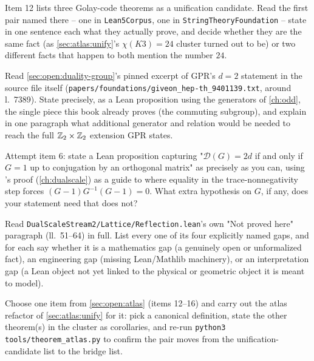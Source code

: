 \begin{exercise}[$\star$]
Item 12 lists three Golay-code theorems as a unification candidate. Read the first pair
named there -- one in \texttt{Lean5Corpus}, one in \texttt{StringTheoryFoundation} -- state
in one sentence each what they actually prove, and decide whether they are the same fact
(as \cref{sec:atlas:unify}'s $\chi(K3)=24$ cluster turned out to be) or two different facts
that happen to both mention the number $24$.
\end{exercise}

\begin{exercise}[$\star\star$]
Read \cref{sec:open:duality-group}'s pinned excerpt of GPR's $d=2$ statement in the source
file itself (\texttt{papers/foundations/giveon\_hep-th\_9401139.txt}, around l.~7389).
State precisely, as a Lean proposition using the generators of \cref{ch:odd}, the single
piece this book already proves (the commuting subgroup), and explain in one paragraph what
additional generator and relation would be needed to reach the full $\mathbb{Z}_2\times\mathbb{Z}_2$
extension GPR states.
\end{exercise}

\begin{exercise}[$\star\star$]
Attempt item 6: state a Lean proposition capturing "$\mathcal D(G)=2d$ if and only if $G=1$
up to conjugation by an orthogonal matrix" as precisely as you can, using
's proof (\cref{ch:dualscale}) as a guide to where equality in the
trace-nonnegativity step forces $(G-1)G^{-1}(G-1)=0$. What extra hypothesis on $G$, if any,
does your statement need that  does not?
\end{exercise}

\begin{exercise}[$\star\star$]
Read \texttt{DualScaleStream2/Lattice/Reflection.lean}'s own "Not proved here" paragraph
(ll.~51--64) in full. List every one of its four explicitly named gaps, and for each say
whether it is a mathematics gap (a genuinely open or unformalized fact), an engineering
gap (missing Lean/Mathlib machinery), or an interpretation gap (a Lean object not yet
linked to the physical or geometric object it is meant to model).
\end{exercise}

\begin{exercise}[$\star\star$]
Choose one item from \cref{sec:open:atlas} (items 12--16) and carry out the atlas
refactor of \cref{sec:atlas:unify} for it: pick a canonical definition, state the other
theorem(s) in the cluster as corollaries, and re-run
\texttt{python3 tools/theorem\_atlas.py} to confirm the pair moves from the
unification-candidate list to the bridge list.
\end{exercise}

